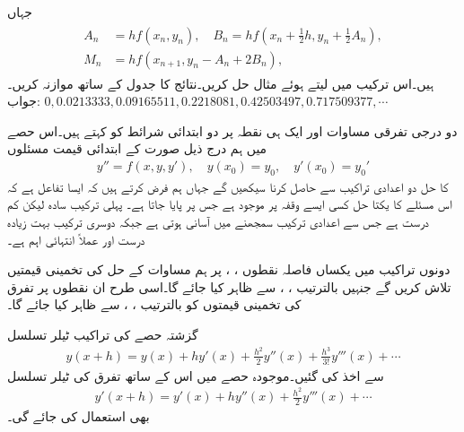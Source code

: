 جہاں
\begin{gather}
\begin{aligned}
A_n&=hf(x_n,y_n),\quad B_n=hf(x_n+\tfrac{1}{2}h,y_n+\tfrac{1}{2}A_n),\\
M_n&=hf(x_{n+1},y_n-A_n+2B_n),
\end{aligned}
\end{gather}
ہیں۔اس ترکیب میں  لیتے ہوئے مثال  حل کریں۔نتائج کا جدول  کے ساتھ موازنہ کریں۔\\
جواب:\quad
$0,0.0213333,0.09165511,0.2218081,0.42503497,0.717509377,\cdots$

دو درجی تفرقی مساوات اور  ایک ہی نقطہ پر دو ابتدائی شرائط کو   کہتے ہیں۔اس حصے میں ہم درج ذیل صورت کے ابتدائی قیمت مسئلوں 
\begin{align}\label{مساوات_اعدادی_دو_درجی-ابتدائی_قیمت_الف}
y''=f(x,y,y'),\quad y(x_0)=y_0,\quad y'(x_0)=y_0'
\end{align} 
کا حل دو اعدادی تراکیب سے حاصل کرنا سیکھیں گے جہاں ہم فرض کرتے ہیں کہ  ایسا تفاعل ہے کہ اس مسئلے کا یکتا حل کسی ایسے وقفہ پر  موجود ہے جس پر  پایا جاتا ہے۔ پہلی ترکیب سادہ لیکن کم درست ہے جس سے اعدادی ترکیب سمجھنے میں آسانی ہوتی ہے  جبکہ دوسری ترکیب بہت زیادہ درست اور عملاً انتہائی اہم ہے۔

دونوں تراکیب میں یکساں فاصلہ  نقطوں ، ،  پر  ہم مساوات  کے حل  کی تخمینی قیمتیں تلاش کریں گے جنہیں بالترتیب ، ،  سے ظاہر کیا جائے گا۔اسی طرح ان نقطوں پر تفرق  کی تخمینی قیمتوں کو بالترتیب ، ،  سے ظاہر کیا جائے گا۔

گزشتہ حصے کی تراکیب ٹیلر تسلسل
\begin{align}\label{مساوات_اعدادی_دو_درجی-ابتدائی_قیمت_ب}
y(x+h)=y(x)+hy'(x)+\tfrac{h^2}{2}y''(x)+\tfrac{h^3}{3!}y'''(x)+\cdots
\end{align}
سے اخذ کی گئیں۔موجودہ حصے میں اس کے ساتھ تفرق کی ٹیلر تسلسل
\begin{align}\label{مساوات_اعدادی_دو_درجی-ابتدائی_قیمت_پ}
y'(x+h)=y'(x)+hy''(x)+\tfrac{h^2}{2}y'''(x)+\cdots
\end{align}
بھی استعمال کی جائے گی۔

